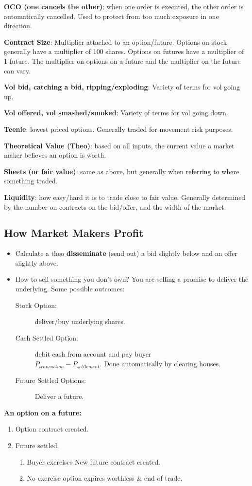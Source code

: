 \documentclass{article}
\begin{document}
\textbf{OCO (one cancels the other)}: when one order is executed, the other order
is automatically cancelled. Used to protect from too much exposure in one direction.

\textbf{Contract Size}: Multiplier attached to an option/future. Options
on stock generally have a multiplier of 100 shares. Options on futures
have a multiplier of 1 future. The multiplier on options on a future and the
multiplier on the future can vary.

\textbf{Vol bid, catching a bid, ripping/exploding}: Variety of terms for vol
going up.

\textbf{Vol offered, vol smashed/smoked}: Variety of terms for vol going down.

\textbf{Teenie}: lowest priced options. Generally traded for movement risk purposes.

\textbf{Theoretical Value (Theo)}: based on all inputs, the current value a market
maker believes an option is worth.

\textbf{Sheets (or fair value)}: same as above, but generally when referring to
where something traded.

\textbf{Liquidity}: how easy/hard it is to trade close to fair value.
Generally determined by the number on contracts on the bid/offer, and the width
of the market.

\subsection{How Market Makers Profit}
\begin{itemize}
    \item Calculate a theo \textbf{disseminate} (send out) a bid slightly below and an offer
slightly above.
    \item How to sell something you don't own? You are selling a promise to deliver
the underlying. Some possible outcomes:
\begin{description}
    \item[Stock Option:] deliver/buy underlying shares.
    \item[Cash Settled Option:] debit cash from account and pay buyer\\
    $P_{transaction} - P_{settlement}$. Done automatically by clearing houses.
    \item[Future Settled Options:] Deliver a future. 
\end{description}
\end{itemize}

\textbf{An option on a future:}
\begin{enumerate}
    \item Option contract created.
    \item Future settled.
    \begin{enumerate}
        \item Buyer exercises \textrightarrow New future contract created.
        \item No exercise \textrightarrow option expires worthless \& end of trade.
    \end{enumerate}
\end{enumerate}
\end{document}
